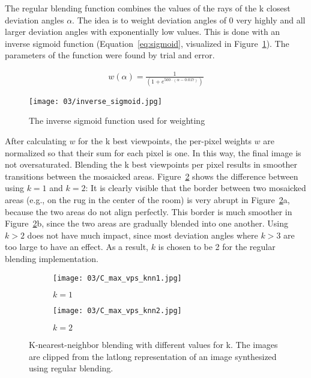The regular blending function combines the values of the rays of the k closest deviation angles $\alpha$. The idea is to weight deviation angles of 0 very highly and all larger deviation angles with exponentially low values. This is done with an inverse sigmoid function (Equation~\ref{eq:sigmoid}, visualized in Figure~\ref{fig:sigmoid}). The parameters of the function were found by trial and error.

\begin{align}
  w(\alpha) = \frac{1}{(1 + e^{500\cdot(\alpha - 0.017)})} \label{eq:sigmoid}
\end{align}

\begin{figure}
		\centering
		\texttt{[image: 03/inverse\_sigmoid.jpg]}
		\caption{The inverse sigmoid function used for weighting}
		\label{fig:sigmoid}
\end{figure}

\noindent
After calculating $w$ for the k best viewpoints, the per-pixel weights $w$ are normalized so that their sum for each pixel is one. In this way, the final image is not oversaturated.
Blending the k best viewpoints per pixel results in smoother transitions between the mosaicked areas. Figure~\ref{fig:knn} shows the difference between using $k=1$ and $k=2$: It is clearly visible that the border between two mosaicked areas (e.g., on the rug in the center of the room) is very abrupt in Figure~\ref{fig:knn}a, because the two areas do not align perfectly. This border is much smoother in Figure~\ref{fig:knn}b, since the two areas are gradually blended into one another. Using $k>2$ does not have much impact, since most deviation angles where $k>3$ are too large to have an effect. As a result, $k$ is chosen to be 2 for the regular blending implementation.

\begin{figure}
\centering
    \hfill
    \begin{subfigure}[t]{0.5\textwidth}
            \centering
            \texttt{[image: 03/C\_max\_vps\_knn1.jpg]}
            \caption{$k=1$}
    \end{subfigure}%
    \hfill
    \begin{subfigure}[t]{0.5\textwidth}
            \centering
            \texttt{[image: 03/C\_max\_vps\_knn2.jpg]}
            \caption{$k=2$}
    \end{subfigure}
    \hfill
  \caption[K-nearest-neighbor blending with different values for k]{K-nearest-neighbor blending with different values for k. The images are clipped from the latlong representation of an image synthesized using regular blending.} \label{fig:knn}
\end{figure}

